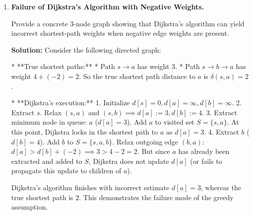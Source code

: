 \documentclass[12pt, a4paper]{book}
\begin{document}
\begin{problembox}
\begin{enumerate}[label=\textbf{E\arabic*.}]
        4. **Iteration 3:**
           Extract minimum node $u = b$ ($d[b] = 4$). Add to $S = \{s, a, b\}$.
           Relax outgoing edges from $b$:
           * Edge $(b, c)$ with weight 2: $d[c] > d[b] + 2 \implies 4 > 4 + 2$ (no change).
           Queue state: $Q = \{ (c,4) \}$.
           
        5. **Iteration 4:**
           Extract minimum node $u = c$ ($d[c] = 4$). Add to $S = \{s, a, b, c\}$.
           Queue is empty.
           
        Final shortest path estimates: $d[s] = 0, d[a] = 3, d[b] = 4, d[c] = 4$.
        
  \item \textbf{Failure of Dijkstra's Algorithm with Negative Weights.}
  
        Provide a concrete 3-node graph showing that Dijkstra's algorithm can yield incorrect shortest-path weights when negative edge weights are present.
        
        \textbf{Solution:}
        Consider the following directed graph:
        \begin{center}
        \end{center}
        * **True shortest paths:**
          * Path $s \to a$ has weight $3$.
          * Path $s \to b \to a$ has weight $4 + (-2) = 2$.
          So the true shortest path distance to $a$ is $\delta(s, a) = 2$.
          
        * **Dijkstra's execution:**
          1. Initialize $d[s] = 0, d[a] = \infty, d[b] = \infty$.
          2. Extract $s$. Relax $(s, a)$ and $(s, b) \implies d[a] := 3, d[b] := 4$.
          3. Extract minimum node in queue: $a$ ($d[a] = 3$). Add $a$ to visited set $S = \{s, a\}$.
             At this point, Dijkstra locks in the shortest path to $a$ as $d[a] = 3$.
          4. Extract $b$ ($d[b] = 4$). Add $b$ to $S = \{s, a, b\}$.
             Relax outgoing edge $(b, a)$: $d[a] > d[b] + (-2) \implies 3 > 4 - 2 = 2$.
             But since $a$ has already been extracted and added to $S$, Dijkstra does not update $d[a]$ (or fails to propagate this update to children of $a$).
             
        Dijkstra's algorithm finishes with incorrect estimate $d[a] = 3$, whereas the true shortest path is $2$. This demonstrates the failure mode of the greedy assumption.
\end{enumerate}
\end{problembox}
\end{document}
